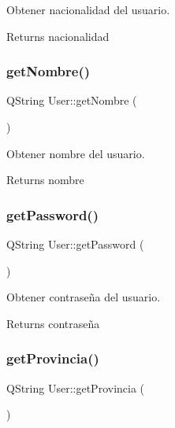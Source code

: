 Obtener nacionalidad del usuario. 

\begin{DoxyReturn}{Returns}
nacionalidad 
\end{DoxyReturn}
\mbox{\label{classUser_a3cc589543a052946a1255135f855b61f}} 
\subsubsection{\texorpdfstring{get\+Nombre()}{getNombre()}}
{\footnotesize\ttfamily Q\+String User\+::get\+Nombre (\begin{DoxyParamCaption}{ }\end{DoxyParamCaption})}



Obtener nombre del usuario. 

\begin{DoxyReturn}{Returns}
nombre 
\end{DoxyReturn}
\mbox{\label{classUser_a96d673c7c62ecdfdd4c509db8350262d}} 
\subsubsection{\texorpdfstring{get\+Password()}{getPassword()}}
{\footnotesize\ttfamily Q\+String User\+::get\+Password (\begin{DoxyParamCaption}{ }\end{DoxyParamCaption})}



Obtener contraseña del usuario. 

\begin{DoxyReturn}{Returns}
contraseña 
\end{DoxyReturn}
\mbox{\label{classUser_a539732e0d7d830e5027648c429c7d1ff}} 
\subsubsection{\texorpdfstring{get\+Provincia()}{getProvincia()}}
{\footnotesize\ttfamily Q\+String User\+::get\+Provincia (\begin{DoxyParamCaption}{ }\end{DoxyParamCaption})}




